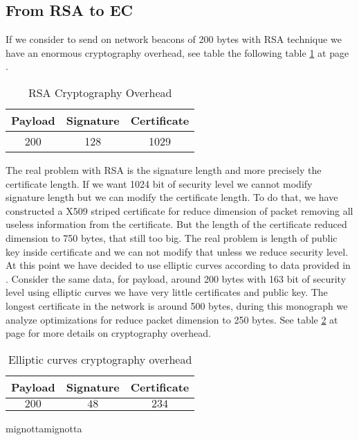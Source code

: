 \subsection{From RSA to EC}
If we consider to send on network beacons of 200 bytes with RSA technique we have an enormous cryptography overhead, see table the following table \ref{tab:RSAOverHead} at page \pageref{tab:RSAOverHead}.
\begin{table}[!ht]
	\centering
	\caption{RSA Cryptography Overhead}
	\begin{tabular}{|c|c|c|}
	\hline\hline 
	\textbf{Payload} & \textbf{Signature} & \textbf{Certificate}\\
	\hline
	200 & 128 & 1029 \\
	\hline
	\hline     %
 	\end{tabular} 
	\label{tab:RSAOverHead}
\end{table}
The real problem with RSA is the signature length and more precisely the  certificate length. If we want 1024 bit of security level we cannot modify signature length but we can modify the  certificate length. To do that, we have constructed a X509 striped certificate for reduce dimension of packet removing all useless information from the  certificate. But the length of the certificate reduced dimension to 750 bytes, that still too big. The real problem is length of public key inside certificate and we can not modify that unless we reduce security level.\\
At this point we have decided to use elliptic curves according to data provided in \cite{calandriello}. Consider the same data, for payload, around 200 bytes with 163 bit of security level using elliptic curves we have very little certificates and public key. The longest certificate in the network is around 500 bytes, during this monograph we analyze optimizations for reduce packet dimension to 250 bytes. See table \ref{tab:CryptographyOverhead} at page \pageref{tab:CryptographyOverhead} for more details on cryptography overhead.
\begin{table}[!ht]
	\centering
	\caption{Elliptic curves cryptography overhead}
	\begin{tabular}{|c|c|c|}
	\hline\hline 
	\textbf{Payload} & \textbf{Signature} & \textbf{Certificate}\\
	\hline
	$200$ &	$48$ & $234$\\
	\hline
	\hline     %
 	\end{tabular} mignottamignotta
	\label{tab:CryptographyOverhead}
\end{table}
